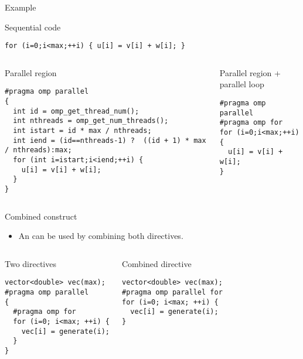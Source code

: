 \begin{frame}[t,fragile]{Example}
\begin{block}{Sequential code}
\begin{lstlisting}
for (i=0;i<max;++i) { u[i] = v[i] + w[i]; }
\end{lstlisting}
\end{block}

\begin{columns}[T]


\begin{block}{Parallel region}
\begin{lstlisting}[basicstyle=\tiny]
#pragma omp parallel
{
  int id = omp_get_thread_num();
  int nthreads = omp_get_num_threads();
  int istart = id * max / nthreads;
  int iend = (id==nthreads-1) ?  ((id + 1) * max / nthreads):max;
  for (int i=istart;i<iend;++i) { 
    u[i] = v[i] + w[i]; 
  }
}
\end{lstlisting}
\end{block}


\begin{block}{Parallel region + parallel loop}
\begin{lstlisting}
#pragma omp parallel
#pragma omp for
for (i=0;i<max;++i) { 
  u[i] = v[i] + w[i]; 
}
\end{lstlisting}
\end{block}

\end{columns}
\end{frame}

\begin{frame}[t,fragile]{Combined construct}
\begin{itemize}
  \item An  can be used by combining both directives.
\end{itemize}

\begin{columns}[T]


\begin{block}{Two directives}
\begin{lstlisting}
vector<double> vec(max);
#pragma omp parallel
{
  #pragma omp for
  for (i=0; i<max; ++i) {
    vec[i] = generate(i);
  }
}
\end{lstlisting}
\end{block}


\begin{block}{Combined directive}
\begin{lstlisting}
vector<double> vec(max);
#pragma omp parallel for
for (i=0; i<max; ++i) {
  vec[i] = generate(i);
}
\end{lstlisting}
\end{block}

\end{columns}
\end{frame}

